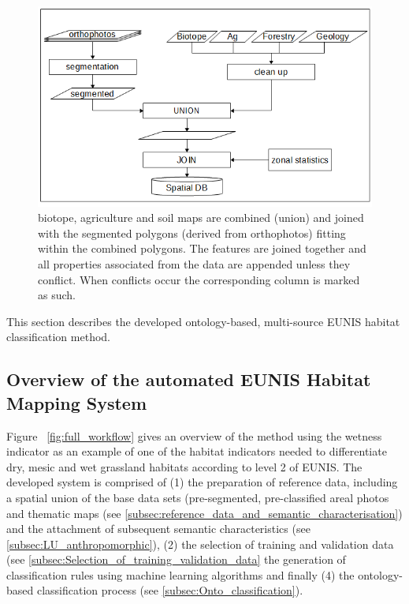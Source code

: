 \documentclass[authoryear, review,12pt,number]{elsarticle}
\begin{document}
\begin{figure} \includegraphics[width=1\textwidth]{diagrams/pre_processing.png}
    \caption{biotope, agriculture and soil maps are combined 
    (union) and joined with the segmented polygons (derived from orthophotos) 
    fitting within the combined polygons. The features are joined together 
    and all properties associated from the data are appended unless they 
    conflict. 
    When conflicts occur the corresponding column is marked as such.}
\label{fig:pre-processing}
\end{figure}

This section describes the developed ontology-based, multi-source EUNIS 
habitat classification method.
\label{subsec:method_overview}
\subsection{Overview of the automated EUNIS Habitat Mapping System}
Figure ~\ref{fig:full_workflow} gives an overview of the method using the
wetness indicator as an example of one of the habitat indicators needed to
differentiate dry, mesic and wet grassland habitats according to level 2 of
EUNIS. The developed system is comprised of (1) the preparation of reference
data, including a spatial union of the base data sets (pre-segmented,
pre-classified areal photos and thematic maps (see 
\ref{subsec:reference_data_and_semantic_characterisation}) and the
attachment of subsequent semantic characteristics (see 
\ref{subsec:LU_anthropomorphic}),
(2) the selection of training and validation data (see
\ref{subsec:Selection_of_training_validation_data}
the generation of classification rules using machine learning algorithms and
finally (4) the ontology-based classification process (see
\ref{subsec:Onto_classification}).
\end{document}

